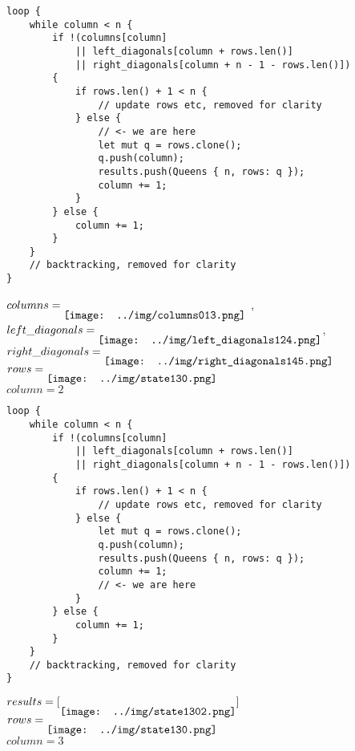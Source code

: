 \begin{frame}[fragile]
    \begin{verbatim}
loop {
    while column < n {
        if !(columns[column]
            || left_diagonals[column + rows.len()]
            || right_diagonals[column + n - 1 - rows.len()])
        {
            if rows.len() + 1 < n {
                // update rows etc, removed for clarity
            } else {
                // <- we are here
                let mut q = rows.clone();
                q.push(column);
                results.push(Queens { n, rows: q });
                column += 1;
            }
        } else {
            column += 1; 
        }
    }
    // backtracking, removed for clarity
}
    \end{verbatim}
    $columns = \raisebox{-2ex}{\texttt{[image: ../img/columns013.png]}}$ ,
    $left\_diagonals = \raisebox{-2ex}{\texttt{[image: ../img/left\_diagonals124.png]}}$,
    $right\_diagonals = \raisebox{-2ex}{\texttt{[image: ../img/right\_diagonals145.png]}}$ \\
    $rows = \raisebox{-2ex}{\texttt{[image: ../img/state130.png]}}$ \\
    $column = 2$
\end{frame}
\begin{frame}[fragile]
    \begin{verbatim}
loop {
    while column < n {
        if !(columns[column]
            || left_diagonals[column + rows.len()]
            || right_diagonals[column + n - 1 - rows.len()])
        {
            if rows.len() + 1 < n {
                // update rows etc, removed for clarity
            } else {
                let mut q = rows.clone();
                q.push(column);
                results.push(Queens { n, rows: q });
                column += 1;
                // <- we are here
            }
        } else {
            column += 1; 
        }
    }
    // backtracking, removed for clarity
}
    \end{verbatim}
    $results = [\raisebox{-2ex}{\texttt{[image: ../img/state1302.png]}}]$ \\
    $rows = \raisebox{-2ex}{\texttt{[image: ../img/state130.png]}}$ \\
    $column = 3$
\end{frame}
